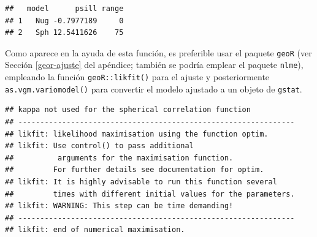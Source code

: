 \documentclass[
  spanish,
]{book}
\newenvironment{Shaded}{\begin{snugshade}}{\end{snugshade}}
\newcommand{\AttributeTok}[1]{\textcolor[rgb]{0.77,0.63,0.00}{#1}}
\newcommand{\DecValTok}[1]{\textcolor[rgb]{0.00,0.00,0.81}{#1}}
\newcommand{\FloatTok}[1]{\textcolor[rgb]{0.00,0.00,0.81}{#1}}
\newcommand{\FunctionTok}[1]{\textcolor[rgb]{0.00,0.00,0.00}{#1}}
\newcommand{\NormalTok}[1]{#1}
\newcommand{\OtherTok}[1]{\textcolor[rgb]{0.56,0.35,0.01}{#1}}
\newcommand{\SpecialCharTok}[1]{\textcolor[rgb]{0.00,0.00,0.00}{#1}}
\newcommand{\StringTok}[1]{\textcolor[rgb]{0.31,0.60,0.02}{#1}}
\theoremstyle{break}
\theoremstyle{definition}
\theoremstyle{definition}
\theoremstyle{definition}
\theoremstyle{definition}
\theoremstyle{remark}
\begin{document}
\begin{verbatim}
##   model      psill range
## 1   Nug -0.7977189     0
## 2   Sph 12.5411626    75
\end{verbatim}

Como aparece en la ayuda de esta función, es preferible usar el paquete \texttt{geoR} (ver Sección \ref{geor-ajuste} del apéndice; también se podría emplear el paquete \texttt{nlme}), empleando la función \texttt{geoR::likfit()} para el ajuste y posteriormente \texttt{as.vgm.variomodel()} para convertir el modelo ajustado a un objeto de \texttt{gstat}.

\begin{Shaded}
\end{Shaded}

\begin{verbatim}
## kappa not used for the spherical correlation function
## ---------------------------------------------------------------
## likfit: likelihood maximisation using the function optim.
## likfit: Use control() to pass additional
##          arguments for the maximisation function.
##         For further details see documentation for optim.
## likfit: It is highly advisable to run this function several
##         times with different initial values for the parameters.
## likfit: WARNING: This step can be time demanding!
## ---------------------------------------------------------------
## likfit: end of numerical maximisation.
\end{verbatim}
\end{document}

